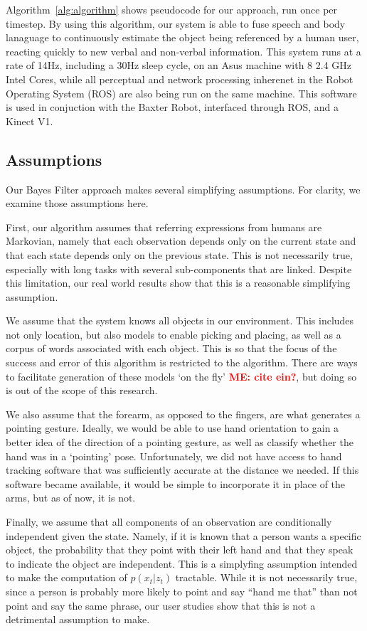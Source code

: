 \documentclass[a4paper, 11pt]{article} %
\newcommand{\menote}[1]{\textcolor{Red}{\textbf{ME: #1}}}
\begin{document}
Algorithm~\ref{alg:algorithm} shows pseudocode for our approach, run once per timestep. 
By using this algorithm, our system is able to fuse speech and body lanaguage to continuously estimate the object being referenced by a human user, reacting quickly to new verbal and non-verbal information. This system runs at a rate of 14Hz, including a 30Hz sleep cycle, on an Asus machine with 8 2.4 GHz Intel Cores, while all perceptual and network processing inherenet in the Robot Operating System (ROS) are also being run on the same machine. This software is used in conjuction with the Baxter Robot, interfaced through ROS, and a Kinect V1.
\subsection{Assumptions}
Our Bayes Filter approach makes several simplifying assumptions. For clarity, we examine those assumptions here.

First, our algorithm assumes that referring expressions from humans are Markovian, namely that each observation depends only on the current state and that each state depends only on the previous state. This is not necessarily true, especially with long tasks with several sub-components that are linked. Despite this limitation, our real world results show that this is a reasonable simplifying assumption.

We assume that the system knows all objects in our environment. This includes not only location, but also models to enable picking and placing, as well as a corpus of words associated with each object. This is so that the focus of the success and error of this algorithm is restricted to the algorithm. There are ways to facilitate generation of these models `on the fly' \menote{cite ein?}, but doing so is out of the scope of this research.

We also assume that the forearm, as opposed to the fingers, are what generates a pointing gesture. Ideally, we would be able to use hand orientation to gain a better idea of the direction of a pointing gesture, as well as classify whether the hand was in a `pointing' pose. Unfortunately, we did not have access to hand tracking software that was sufficiently accurate at the distance we needed. If this software became available, it would be simple to incorporate it in place of the arms, but as of now, it is not.

Finally, we assume that all components of an observation are conditionally independent given the state. Namely, if it is known that a person wants a specific object, the probability that they point with their left hand and that they speak to indicate the object are independent. This is a simplyfing assumption intended to make the computation of $p(x_t | z_t)$ tractable. While it is not necessarily true, since a person is probably more likely to point and say ``hand me that'' than not point and say the same phrase, our user studies show that this is not a detrimental assumption to make.
\end{document}

